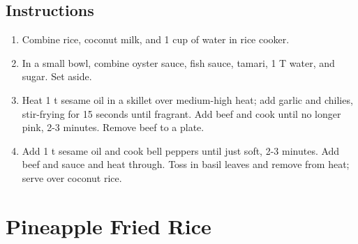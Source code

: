 \documentclass[letterpaper,10pt,english]{sphinxmanual}
\begin{document}

%
\begin{sphinxVerbatim}[commandchars=\\\{\}]
   

  

   

  

  

    

   

    
\end{sphinxVerbatim}


\section{Instructions}
\label{\detokenize{Thai_Basil_Beef:instructions}}\begin{enumerate}
\item {} 
Combine rice, coconut milk, and 1 cup of water in rice cooker.

\item {} 
In a small bowl, combine oyster sauce, fish sauce, tamari, 1 T water, and sugar.  Set aside.

\item {} 
Heat 1 t sesame oil in a skillet over medium-high heat; add garlic and chilies, stir-frying for 15 seconds until fragrant.  Add beef and cook until no longer pink, 2-3 minutes. Remove beef to a plate.

\item {} 
Add 1 t sesame oil and cook bell peppers until just soft, 2-3 minutes. Add beef and sauce and heat through. Toss in basil leaves and remove from heat; serve over coconut rice.

\end{enumerate}


\chapter{Pineapple Fried Rice}
\label{\detokenize{PFR:pineapple-fried-rice}}\label{\detokenize{PFR::doc}}
\end{document}
